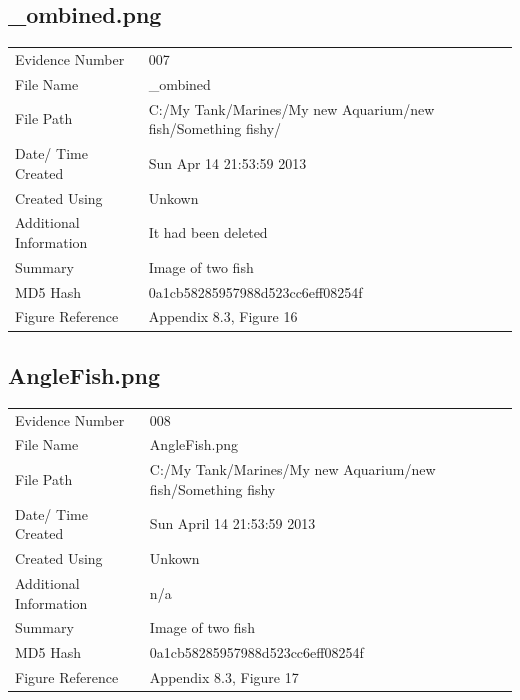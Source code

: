 \documentclass[12pt]{article}
\begin{document}
				\subsection{\_ombined.png}
					\begin{tabular}{l | p{8cm}}
						Evidence Number & 007  \\
			    			File Name & \_ombined  \\
			      			File Path & C:/My Tank/Marines/My new Aquarium/new fish/Something fishy/  \\
						Date/ Time Created & Sun Apr 14 21:53:59 2013 \\
						Created Using & Unkown \\
						Additional Information & It had been deleted \\
						Summary & Image of two fish\\
						MD5 Hash & 0a1cb58285957988d523cc6eff08254f\\
						Figure Reference & Appendix 8.3, Figure 16\\
					\end{tabular}

				\subsection{AngleFish.png}
					\begin{tabular}{l | p{8cm}}
						Evidence Number & 008  \\
			    			File Name & AngleFish.png \\
			      			File Path & C:/My Tank/Marines/My new Aquarium/new fish/Something fishy  \\
						Date/ Time Created & Sun April 14 21:53:59 2013 \\
						Created Using & Unkown \\
						Additional Information & n/a \\
						Summary & Image of two fish\\
						MD5 Hash & 0a1cb58285957988d523cc6eff08254f \\
						Figure Reference & Appendix 8.3, Figure 17\\
					\end{tabular}
				
\end{document}
